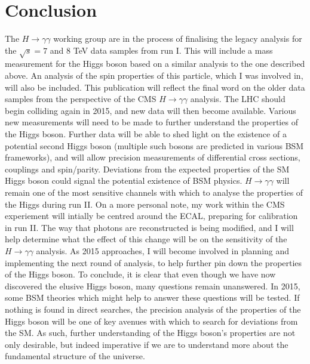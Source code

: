 \documentclass[10pt]{article}
\begin{document}
\section{Conclusion}
The $H \rightarrow \gamma \gamma$ working group are in the process of finalising the legacy analysis for the $\sqrt{s}=7$ and $8$ TeV data samples from run I. This will include a mass measurement for the Higgs boson based on a similar analysis to the one described above. An analysis of the spin properties of this particle, which I was involved in, will also be included. This publication will reflect the final word on the older data samples from the perspective of the CMS $H \rightarrow \gamma \gamma$ analysis. The LHC should begin colliding again in 2015, and new data will then become available. Various new measurements will need to be made to further understand the properties of the Higgs boson. Further data will be able to shed light on the existence of a potential second Higgs boson (multiple such bosons are predicted in various BSM frameworks), and will allow precision measurements of differential cross sections, couplings and spin/parity. Deviations from the expected properties of the SM Higgs boson could signal the potential existence of BSM physics.  $H\rightarrow \gamma \gamma$ will remain one of the most sensitive channels with which to analyse the properties of the Higgs during run II.
On a more personal note, my work within the CMS experiement will intially be centred around the ECAL, preparing for calibration in run II. The way that photons are reconstructed is being modified, and I will help determine what the effect of this change will be on the sensitivity of the $H \rightarrow \gamma \gamma$ analysis. As 2015 approaches, I will become involved in planning and implementing the next round of analysis, to help further pin down the properties of the Higgs boson.
To conclude, it is clear that even though we have now discovered the elusive Higgs boson, many questions remain unanswered. In 2015, some BSM theories which might help to answer these questions will be tested. If nothing is found in direct searches, the precision analysis of the properties of the Higgs boson will be one of key avenues with which to search for deviations from the SM. As such, further understanding of the Higgs boson's properties are not only desirable, but indeed imperative if we are to understand more about the fundamental  structure of the universe.




\end{document}
